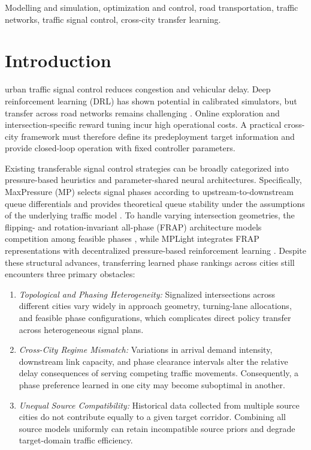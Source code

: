 \documentclass[letterpaper,journal]{IEEEtran}
\begin{document}
\begin{IEEEkeywords}
Modelling and simulation, optimization and control, road transportation, traffic networks, traffic signal control, cross-city transfer learning.
\end{IEEEkeywords}

\section{Introduction}
\label{sec:intro}

 urban traffic signal control reduces congestion and vehicular delay. Deep reinforcement learning (DRL) has shown potential in calibrated simulators, but transfer across road networks remains challenging \cite{wei2019presslight,chen2020thousandlights}. Online exploration and intersection-specific reward tuning incur high operational costs. A practical cross-city framework must therefore define its predeployment target information and provide closed-loop operation with fixed controller parameters.

Existing transferable signal control strategies can be broadly categorized into pressure-based heuristics and parameter-shared neural architectures. Specifically, MaxPressure (MP) selects signal phases according to upstream-to-downstream queue differentials and provides theoretical queue stability under the assumptions of the underlying traffic model \cite{varaiya2013maxpressure}. To handle varying intersection geometries, the flipping- and rotation-invariant all-phase (FRAP) architecture models competition among feasible phases \cite{zheng2019frap}, while MPLight integrates FRAP representations with decentralized pressure-based reinforcement learning \cite{chen2020thousandlights}. Despite these structural advances, transferring learned phase rankings across cities still encounters three primary obstacles:
\begin{enumerate}
    \item \textit{Topological and Phasing Heterogeneity:} Signalized intersections across different cities vary widely in approach geometry, turning-lane allocations, and feasible phase configurations, which complicates direct policy transfer across heterogeneous signal plans.
    \item \textit{Cross-City Regime Mismatch:} Variations in arrival demand intensity, downstream link capacity, and phase clearance intervals alter the relative delay consequences of serving competing traffic movements. Consequently, a phase preference learned in one city may become suboptimal in another.
    \item \textit{Unequal Source Compatibility:} Historical data collected from multiple source cities do not contribute equally to a given target corridor. Combining all source models uniformly can retain incompatible source priors and degrade target-domain traffic efficiency.
\end{enumerate}
\end{document}
